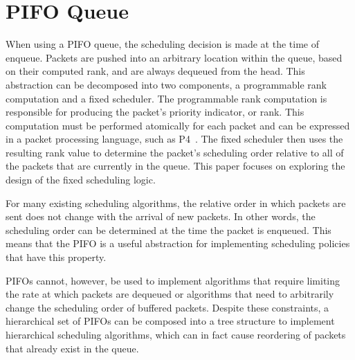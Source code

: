 
\section{PIFO Queue}

When using a PIFO queue, the scheduling decision is made at the time of enqueue. Packets are pushed into an arbitrary location within the queue, based on their computed rank, and are always dequeued from the head. This abstraction can be decomposed into two components, a programmable rank computation and a fixed scheduler. The programmable rank computation is responsible for producing the packet's priority indicator, or rank. This computation must be performed atomically for each packet and can be expressed in a packet processing language, such as P4~\cite{p4:2014}. The fixed scheduler then uses the resulting rank value to determine the packet's scheduling order relative to all of the packets that are currently in the queue. This paper focuses on exploring the design of the fixed scheduling logic.

For many existing scheduling algorithms, the relative order in which packets are sent does not change with the arrival of new packets. In other words, the scheduling order can be determined at the time the packet is enqueued. This means that the PIFO is a useful abstraction for implementing scheduling policies that have this property. 

PIFOs cannot, however, be used to implement algorithms that require limiting the rate at which packets are dequeued or algorithms that need to arbitrarily change the scheduling order of buffered packets. Despite these constraints, a hierarchical set of PIFOs can be composed into a tree structure to implement hierarchical scheduling algorithms, which can in fact cause reordering of packets that already exist in the queue.
